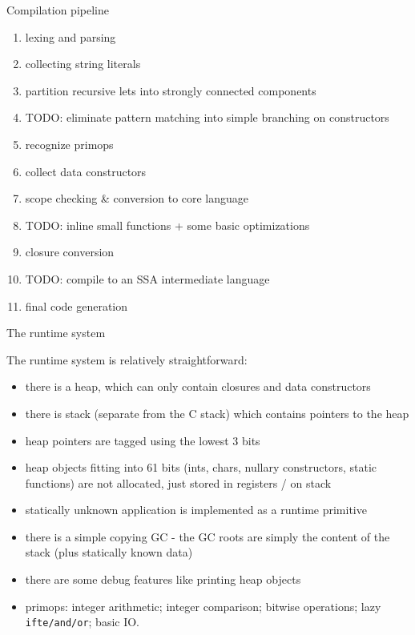 \documentclass{beamer}
\begin{document}

\begin{frame}{Compilation pipeline}

\begin{enumerate}
\item lexing and parsing
\item collecting string literals
\item partition recursive lets into strongly connected components
\item TODO: eliminate pattern matching into simple branching on constructors
\item recognize primops
\item collect data constructors
\item scope checking \& conversion to core language
\item TODO: inline small functions + some basic optimizations
\item closure conversion
\item TODO: compile to an SSA intermediate language
\item final code generation 
\end{enumerate}

\end{frame}


\begin{frame}{The runtime system}

The runtime system is relatively straightforward:

{\small
\begin{itemize}
\item there is a heap, which can only contain closures and data constructors
\item there is stack (separate from the C stack) which contains pointers to the heap
\item heap pointers are tagged using the lowest 3 bits
\item heap objects fitting into 61 bits (ints, chars, nullary constructors, static functions) are
      not allocated, just stored in registers / on stack
\item statically unknown application is implemented as a runtime primitive 
\item there is a simple copying GC - the GC roots are simply the content of the stack
      (plus statically known data)
\item there are some debug features like printing heap objects
\item primops: integer arithmetic; integer comparison; bitwise operations; lazy {\tt ifte/and/or}; basic IO.
\end{itemize}
}

\end{frame}
\end{document}
